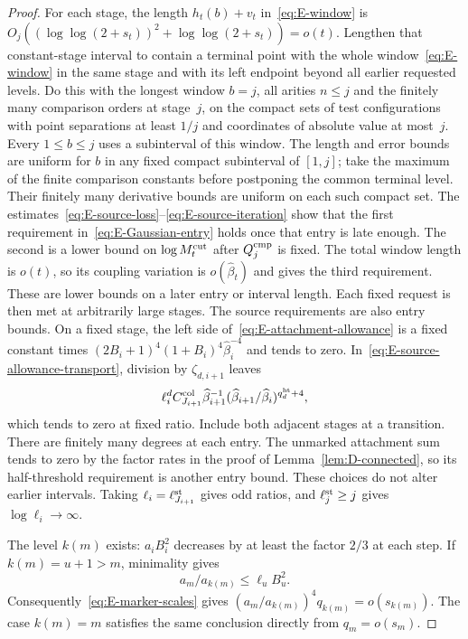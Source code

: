 \begin{proof}
For each stage, the length $h_t(b)+v_t$ in~\eqref{eq:E-window} is $O_j((\log\log(2+s_t))^2+\log\log(2+s_t))=o(t)$. Lengthen that constant-stage interval to contain a terminal point with the whole window~\eqref{eq:E-window} in the same stage and with its left endpoint beyond all earlier requested levels. Do this with the longest window $b=j$, all arities $n\le j$ and the finitely many comparison orders at stage~$j$, on the compact sets of test configurations with point separations at least $1/j$ and coordinates of absolute value at most~$j$. Every $1\le b\le j$ uses a subinterval of this window. The length and error bounds are uniform for $b$ in any fixed compact subinterval of $[1,j]$; take the maximum of the finite comparison constants before postponing the common terminal level. Their finitely many derivative bounds are uniform on each such compact set. The estimates~\eqref{eq:E-source-loss}--\eqref{eq:E-source-iteration} show that the first requirement in~\eqref{eq:E-Gaussian-entry} holds once that entry is late enough. The second is a lower bound on $\log M^{\mathrm{cut}}_t$ after $Q_j^{\rm cmp}$ is fixed. The total window length is $o(t)$, so its coupling variation is $o(\widehat\beta_t)$ and gives the third requirement. These are lower bounds on a later entry or interval length. Each fixed request is then met at arbitrarily large stages. The source requirements are also entry bounds. On a fixed stage, the left side of~\eqref{eq:E-attachment-allowance} is a fixed constant times $(2B_i+1)^4(1+B_i)^4\widehat\beta_i^{-4}$ and tends to zero. In~\eqref{eq:E-source-allowance-transport}, division by $\zeta_{d,i+1}$ leaves
\begin{equation*}
 \ell_i^d C^{\rm col}_{J_{i+1}}\widehat\beta_{i+1}^{-1}
 (\widehat\beta_{i+1}/\widehat\beta_i)^{q^{\rm ht}_d+4},
\end{equation*}
which tends to zero at fixed ratio. Include both adjacent stages at a transition. There are finitely many degrees at each entry. The unmarked attachment sum tends to zero by the factor rates in the proof of Lemma~\ref{lem:D-connected}, so its half-threshold requirement is another entry bound. These choices do not alter earlier intervals. Taking $\ell_i=\ell^{\rm st}_{J_{i+1}}$ gives odd ratios, and $\ell_j^{\rm st}\ge j$ gives $\log\ell_i\to\infty$.

The level $k(m)$ exists: $a_iB_i^2$ decreases by at least the factor $2/3$ at each step. If $k(m)=u+1>m$, minimality gives
\begin{equation}\label{eq:E-first-open}
 a_m/a_{k(m)}\le\ell_uB_u^2.
\end{equation}
Consequently~\eqref{eq:E-marker-scales} gives $(a_m/a_{k(m)})^4q_{k(m)}=o(s_{k(m)})$. The case $k(m)=m$ satisfies the same conclusion directly from $q_m=o(s_m)$.


\end{proof}

